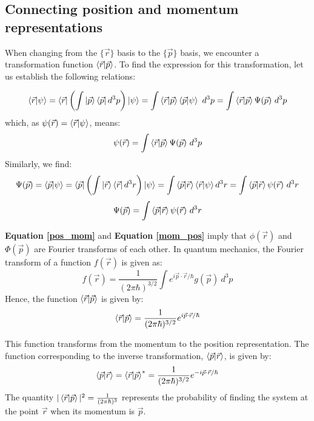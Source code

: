 \subsection{Connecting position and momentum representations}

When changing from the $\{\vec{r}\}$ basis to the $\{\vec{p}\}$ basis, we encounter a transformation function $\braket{\vec{r}|\vec{p}}$. To find the expression for this transformation, let us establish the following relations:

\begin{equation}
    \braket{\vec{r}|\psi} = \bra{\vec{r}}\left(\int \ket{\vec{p}}\bra{\vec{p}}d^3p\right)\ket{\psi} = \int \braket{\vec{r}|\vec{p}}\braket{\vec{p}|\psi}\ d^3p = \int \braket{\vec{r}|\vec{p}}\Psi(\vec{p})\ d^3p
\end{equation}
which, as $\psi(\vec{r}) = \braket{\vec{r}|\psi}$, means:
\begin{equation} \label{pos_mom}
    \psi(\vec{r}) = \int \braket{\vec{r}|\vec{p}}\Psi(\vec{p})\ d^3p
\end{equation}
Similarly, we find:
\begin{equation}
    \Psi(\vec{p}) = \braket{\vec{p}|\psi} = \bra{\vec{p}}\left(\int \ket{\vec{r}}\bra{\vec{r}}d^3r\right)\ket{\psi} = \int \braket{\vec{p}|\vec{r}}\braket{\vec{r}|\psi} d^3r = \int \braket{\vec{p}|\vec{r}}\psi(\vec{r})\ d^3r
\end{equation}
\begin{equation} \label{mom_pos}
    \Psi(\vec{p}) = \int \braket{\vec{p}|\vec{r}}\psi(\vec{r})\ d^3r
\end{equation}

\textbf{Equation \ref{pos_mom}} and \textbf{Equation \ref{mom_pos}} imply that $\phi(\vec{r})$ and $\Phi(\vec{p})$ are Fourier transforms of each other. In quantum mechanics, the Fourier transform of a function $f(\vec{r})$ is given as:
\begin{equation}
    f(\vec{r}) = \frac{1}{(2\pi\hbar)^{3/2}}\int e^{i\vec{p}\cdot \vec{r}/\hbar} g(\vec{p})\ d^3p
\end{equation}
Hence, the function $\braket{\vec{r}|\vec{p}}$ is given by:
\begin{equation} \label{transform_1}
    \braket{\vec{r}|\vec{p}} = \frac{1}{(2\pi\hbar)^{3/2}}e^{i\vec{p}\cdot \vec{r}/\hbar}
\end{equation}

This function transforms from the momentum to the position representation. The function corresponding to the inverse transformation, $\braket{\vec{p}|\vec{r}}$, is given by:
\begin{equation}
    \braket{\vec{p}|\vec{r}} = \braket{\vec{r}|\vec{p}}^* = \frac{1}{(2\pi\hbar)^{3/2}}e^{-i\vec{p}\cdot \vec{r}/\hbar}
\end{equation}
The quantity $|\braket{\vec{r}|\vec{p}}|^2 = \frac{1}{(2\pi\hbar)^3}$ represents the probability of finding the system at the point $\vec{r}$ when its momentum is $\vec{p}$.

